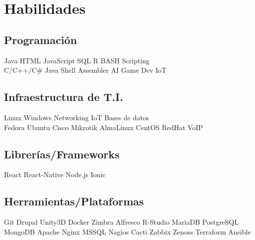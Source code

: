 \documentclass[]{plushcv}
\begin{document}
\begin{minipage}[t]{0.25\textwidth} 


\section{Habilidades}
\subsection{Programación}
\sectionsep
{}
Java \textbullet{} HTML \textbullet{} JavaScript \textbullet{} SQL \textbullet{} R \textbullet{} BASH Scripting \\
\sectionsep
{}
C/C++/C\# \textbullet{} Java \textbullet{} Shell \textbullet{}  Assembler \textbullet{} AI \textbullet{} Game Dev \textbullet{} IoT \\
\sectionsep

\subsection{Infraestructura de T.I.}
Linux \textbullet{} Windows \textbullet{} Networking \textbullet{} IoT \textbullet{} Bases de datos \\
\sectionsep
{}
Fedora \textbullet{} Ubuntu \textbullet{} Cisco \textbullet{} Mikrotik \textbullet{} AlmaLinux \textbullet{} CentOS \textbullet{} RedHat \textbullet{} VoIP \\
\sectionsep


\subsection{Librerías/Frameworks}
\sectionsep
React \textbullet{} React-Native \textbullet{} Node.js \textbullet{} Ionic \\
\sectionsep
\sectionsep
\subsection{Herramientas/Plataformas}
\sectionsep
Git \textbullet{} Drupal \textbullet{} Unity3D \textbullet{} Docker \textbullet{} Zimbra \textbullet{} Alfresco \textbullet{} R-Studio \textbullet{} MariaDB \textbullet{} PostgreSQL \textbullet{} MongoDB \textbullet{} Apache \textbullet{} Nginx \textbullet{} MSSQL \textbullet{} Nagios \textbullet{} Cacti \textbullet{} Zabbix \textbullet{} Zenoss \textbullet{} Terraform \textbullet{} Ansible \\


\end{minipage}
\end{document}
